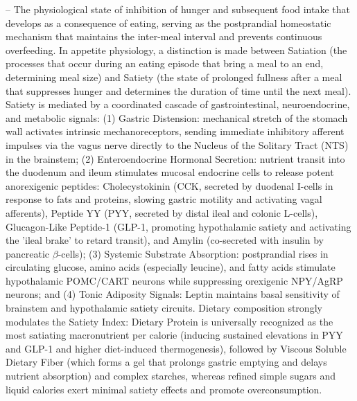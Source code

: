 -- The physiological state of inhibition of hunger and subsequent food intake that develops as a consequence of eating, serving as the postprandial homeostatic mechanism that maintains the inter-meal interval and prevents continuous overfeeding. In appetite physiology, a distinction is made between Satiation (the processes that occur during an eating episode that bring a meal to an end, determining meal size) and Satiety (the state of prolonged fullness after a meal that suppresses hunger and determines the duration of time until the next meal). Satiety is mediated by a coordinated cascade of gastrointestinal, neuroendocrine, and metabolic signals: (1) Gastric Distension: mechanical stretch of the stomach wall activates intrinsic mechanoreceptors, sending immediate inhibitory afferent impulses via the vagus nerve directly to the Nucleus of the Solitary Tract (NTS) in the brainstem; (2) Enteroendocrine Hormonal Secretion: nutrient transit into the duodenum and ileum stimulates mucosal endocrine cells to release potent anorexigenic peptides: Cholecystokinin (CCK, secreted by duodenal I-cells in response to fats and proteins, slowing gastric motility and activating vagal afferents), Peptide YY (PYY, secreted by distal ileal and colonic L-cells), Glucagon-Like Peptide-1 (GLP-1, promoting hypothalamic satiety and activating the 'ileal brake' to retard transit), and Amylin (co-secreted with insulin by pancreatic $\beta$-cells); (3) Systemic Substrate Absorption: postprandial rises in circulating glucose, amino acids (especially leucine), and fatty acids stimulate hypothalamic POMC/CART neurons while suppressing orexigenic NPY/AgRP neurons; and (4) Tonic Adiposity Signals: Leptin maintains basal sensitivity of brainstem and hypothalamic satiety circuits. Dietary composition strongly modulates the Satiety Index: Dietary Protein is universally recognized as the most satiating macronutrient per calorie (inducing sustained elevations in PYY and GLP-1 and higher diet-induced thermogenesis), followed by Viscous Soluble Dietary Fiber (which forms a gel that prolongs gastric emptying and delays nutrient absorption) and complex starches, whereas refined simple sugars and liquid calories exert minimal satiety effects and promote overconsumption.

